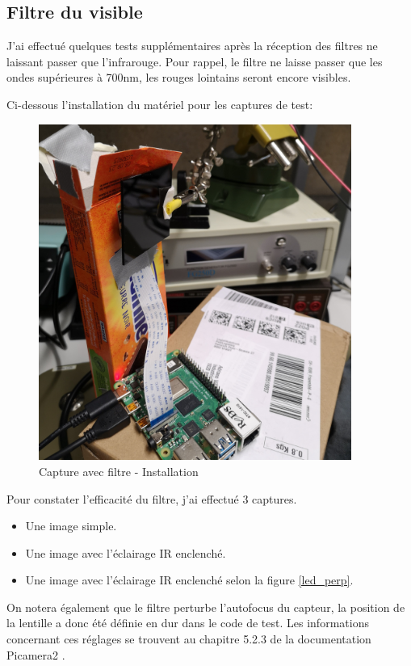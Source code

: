 \subsection{Filtre du visible}
J'ai effectué quelques tests supplémentaires après la réception des filtres ne laissant passer que l'infrarouge. Pour rappel, le filtre
ne laisse passer que les ondes supérieures à 700nm, les rouges lointains seront encore visibles.

Ci-dessous l'installation du matériel pour les captures de test:
\begin{figure}[H]
    \centering
    \includegraphics[height=11cm]{assets/figures/filtre.jpg}
    \caption{Capture avec filtre - Installation}
\end{figure}

Pour constater l'efficacité du filtre, j'ai effectué 3 captures.
\begin{itemize}
    \item Une image simple.
    \item Une image avec l'éclairage IR enclenché.
    \item Une image avec l'éclairage IR enclenché selon la figure \ref{led_perp}.
\end{itemize}
On notera également que le filtre perturbe l'autofocus du capteur, la position de la lentille a donc été définie en dur dans le code de test.
Les informations concernant ces réglages se trouvent au chapitre 5.2.3 de la documentation Picamera2 \cite{picamera2}.

